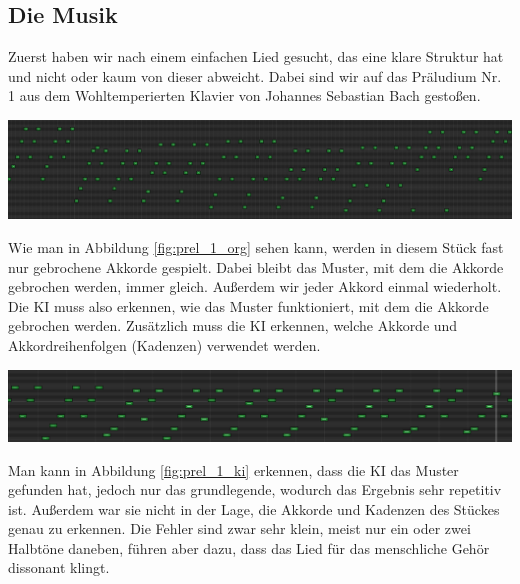 \documentclass[11pt, a4paper, ngerman]{article}
\begin{document}
	\subsection{Die Musik}
	
	Zuerst haben wir nach einem einfachen Lied gesucht, das eine klare Struktur hat und nicht oder kaum von dieser abweicht. Dabei sind wir auf das Präludium Nr. 1 aus dem Wohltemperierten Klavier von Johannes Sebastian Bach gestoßen.
	
	\vspace{1.25ex}
	\begingroup
	\noindent \includegraphics{"pictures/prel_1_org.png"}
	 \label{fig:prel_1_org}
	\endgroup
	\vspace{1.25ex}
	
	Wie man in Abbildung \ref{fig:prel_1_org} sehen kann, werden in diesem Stück fast nur gebrochene Akkorde gespielt. Dabei bleibt das Muster, mit dem die Akkorde gebrochen werden, immer gleich. Außerdem wir jeder Akkord einmal wiederholt. Die KI muss also erkennen, wie das Muster funktioniert, mit dem die Akkorde gebrochen werden. Zusätzlich muss die KI erkennen, welche Akkorde und Akkordreihenfolgen (Kadenzen) verwendet werden.
	
	\vspace{1.25ex}
	\begingroup
	\noindent \includegraphics{"pictures/prel_1_ki.png"}
	 \label{fig:prel_1_ki}
	\endgroup
	\vspace{1.25ex}
	
	Man kann in Abbildung \ref{fig:prel_1_ki} erkennen, dass die KI das Muster gefunden hat, jedoch nur das grundlegende, wodurch das Ergebnis sehr repetitiv ist. Außerdem war sie nicht in der Lage, die Akkorde und Kadenzen des Stückes genau zu erkennen. Die Fehler sind zwar sehr klein, meist nur ein oder zwei Halbtöne daneben, führen aber dazu, dass das Lied für das menschliche Gehör dissonant klingt.
	
\end{document}
